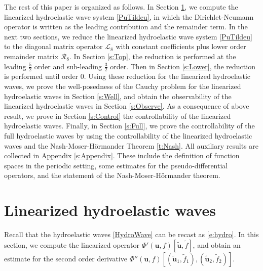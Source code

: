 \documentclass[12pt]{amsart}
\theoremstyle{remark}
\theoremstyle{definition}
\numberwithin{equation}{section}
\newcommand{\f}{\frac}
\newcommand{\mL}{\mathcal{L}}
\newcommand{\mR}{\mathcal{R}}
\begin{document}
The rest of this paper is organized as follows. 
In Section \ref{s:Linearized}, we compute the linearized hydroelastic wave system \eqref{PuTildeu}, in which the Dirichlet-Neumann operator is written as the leading contribution and the remainder term.
In the next two sections, we reduce the linearized hydroelastic wave system \eqref{PuTildeu} to the diagonal matrix operator $\mL_8$ with constant coefficients plus lower order remainder matrix $\mR_8$.
In Section \ref{s:Top}, the reduction is performed at the leading $\f52$ order and sub-leading $\f32$ order.
Then in Section \ref{s:Lower}, the reduction is performed until order $0$.
Using these reduction for the linearized hydroelastic waves, we prove the well-posedness of the Cauchy problem for the linearized hydroelastic waves in Section \ref{s:Well}, and obtain the observability of the linearized hydroelastic waves in Section \ref{s:Observe}.
As a consequence of above result, we prove in Section \ref{s:Control} the controllability of the linearized hydroelastic waves.
Finally, in Section \ref{s:Full}, we prove the controllability of the full hydroelastic waves by using the controllability of the linearized hydroelastic waves and the Nash-Moser-H\"ormander Theorem \ref{t:Nash}.
All auxiliary results are collected in Appendix \ref{s:Appendix}.
These include the definition of function spaces in the periodic setting, some estimates for the pseudo-differential operators, and the statement of the Nash-Moser-H\"ormander theorem.


\section{Linearized hydroelastic waves} \label{s:Linearized}
Recall that the hydroelastic waves \eqref{HydroWave} can be recast as \eqref{e:hydro}.
In this section, we compute the linearized operator $\Phi'(\mathbf{u}, f)[\tilde{\mathbf{u}}, \tilde{f}]$, and obtain an estimate for the second order derivative $\Phi''(\mathbf{u},f)[(\tilde{\mathbf{u}}_1, \tilde{f}_1), (\tilde{\mathbf{u}}_2, \tilde{f}_2)]$.
\end{document}
